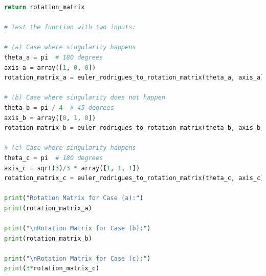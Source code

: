 \documentclass[conference]{IEEEtran}
\begin{document}
\begin{lstlisting}[language=Python]
    return rotation_matrix

# Test the function with two inputs:

# (a) Case where singularity happens
theta_a = pi  # 180 degrees
axis_a = array([1, 0, 0])
rotation_matrix_a = euler_rodrigues_to_rotation_matrix(theta_a, axis_a)

# (b) Case where singularity does not happen
theta_b = pi / 4  # 45 degrees
axis_b = array([0, 1, 0])
rotation_matrix_b = euler_rodrigues_to_rotation_matrix(theta_b, axis_b)

# (c) Case where singularity happens
theta_c = pi  # 180 degrees
axis_c = sqrt(3)/3 * array([1, 1, 1])
rotation_matrix_c = euler_rodrigues_to_rotation_matrix(theta_c, axis_c)

print("Rotation Matrix for Case (a):")
print(rotation_matrix_a)

print("\nRotation Matrix for Case (b):")
print(rotation_matrix_b)

print("\nRotation Matrix for Case (c):")
print(3*rotation_matrix_c)
\end{lstlisting}

\end{document}
